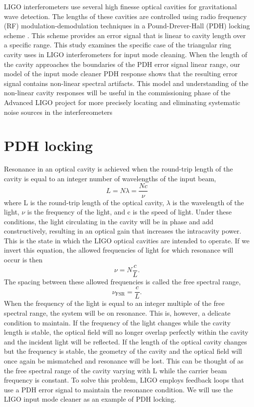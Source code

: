 LIGO interferometers use several high finesse optical cavities for gravitational wave 
detection. The lengths of these cavities are controlled using radio frequency 
(RF) modulation-demodulation techniques in a Pound-Drever-Hall (PDH) locking scheme 
\cite{Black01}.  
This scheme provides an error signal that is linear to cavity length over a 
specific range. This study examines the specific case of the triangular ring cavity 
uses in LIGO interferometers for input mode cleaning. When the length of the cavity 
approaches the boundaries of the PDH error signal linear range, our model of the 
input mode cleaner PDH response shows that the resulting error signal contains 
non-linear spectral artifacts. This model and understanding of the non-linear 
cavity responses will be useful in the commissioning phase of the Advanced LIGO 
project for more precisely locating and eliminating systematic noise sources in 
the interfereometers

\section{PDH locking}

Resonance in an optical cavity is achieved when the round-trip length of the 
cavity is equal to an integer number of wavelengths of the input beam,
\begin{equation}
L = N\lambda = \frac{Nc}{\nu}
\end{equation}
where L is the round-trip length of the optical cavity, $\lambda$ is the 
wavelength of the light, $\nu$ is the frequency of the light, and c is the 
speed of light. 
Under these conditions, the light circulating in the cavity
will be in phase and add constructively, resulting in an optical gain that
increases the intracavity power. This is the state in which the LIGO 
optical cavities are intended to operate.
If we invert this equation, the allowed 
frequencies of light for which resonance will occur is then 
\begin{equation}
\nu = N\frac{c}{L}.
\end{equation}
The spacing between these allowed frequencies is called the free spectral 
range, 
\begin{equation}
\nu_\mathrm{FSR} = \frac{c}{L}.
\end{equation}
When the frequency of the light is equal to an integer multiple of 
the free spectral range, the system will be on resonance. This is, 
however, a delicate condition to maintain. If the frequency of the light 
changes while the cavity length is stable, the optical field will no longer 
overlap perfectly within the cavity 
and the incident light will be reflected. If the length of the optical cavity 
changes but the frequency is stable, the geometry of the cavity and the optical 
field will once again be mismatched and resonance will be lost. 
This can be thought of as the free spectral range of the cavity varying with L 
while the carrier beam frequency is constant. 
To solve this problem, LIGO 
employs feedback loops that use a PDH error signal to maintain the resonance 
condition. We will use the LIGO input mode cleaner as an example of PDH locking.

